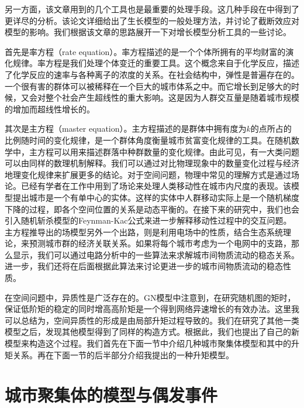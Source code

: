 另一方面，该文章用到的几个工具也是最重要的处理手段。这几种手段在\cite{Bagrow_2008}中得到了更详尽的分析。该论文详细给出了生长模型的一般处理方法，并讨论了截断效应对模型的影响。我们根据该文章的思路展开一下对增长模型分析工具的一些讨论。

首先是率方程（rate equation）。率方程描述的是一个个体所拥有的平均财富的演化规律。率方程是我们处理个体变迁的重要工具。这个概念来自于化学反应，描述了化学反应的速率与各种离子的浓度的关系。在社会结构中，弹性\cite{gao2016universal}是普遍存在的。一个很有害的群体可以被稀释在一个巨大的城市体系之中。而它增长到足够大的时候，又会对整个社会产生超线性的重大影响\cite{schlapfer2014scaling}。这是因为人群交互量是随着城市规模的增加而超线性增长的。

其次是主方程（master equation）。主方程描述的是群体中拥有度为$k$的点所占的比例随时间的变化规律，是一个群体角度衡量城市贫富变化规律的工具。在随机数学中，主方程可以用来描述群落中种群数量的变化规律。由此可见，有一大类问题可以由同样的数理机制解释。我们可以通过对比物理现象中的数量变化过程与经济地理变化规律来扩展更多的结论。对于空间问题，物理中常见的理解方式是通过场论。已经有学者在工作中用到了场论来处理人类移动性在城市内尺度的表现\cite{molas2017field}。该模型提出城市是一个有单中心的实体。这样的实体中人群移动实际上是一个随机梯度下降的过程，即各个空间位置的关系是动态平衡的。在接下来的研究中，我们也会引入随机斩杀模型的Feynman-Kac公式\cite{PhysRevE.98.052114}来进一步解释移动性过程中的交互问题。主方程推导出的场模型另外一个出路，则是利用电场中的性质，结合生态系统理论，来预测城市群的经济关联关系。如果将每个城市考虑为一个电网中的支路，那么\cite{doyle1984random,Volchenkov2011Random}显示，我们可以通过电路分析中的一些算法来求解城市间物质流动的稳态关系。进一步，我们还将在后面根据此算法来讨论更进一步的城市间物质流动的稳态性质。

在空间问题中，异质性是广泛存在的。GN模型中注意到，在研究随机图的矩时，保证低阶矩的稳定的同时增高高阶矩是一个得到网络异速增长的有效办法。这里我可以总结为，空间异质性的形成是由局部升矩过程导致的。我们在研究了其他一类模型之后，发现其他模型得到了同样的构造方式。根据此，我们也提出了自己的新模型来构造这个过程。我们首先在下面一节中介绍几种城市聚集体模型和其中的升矩关系。再在下面一节的后半部分介绍我提出的一种升矩模型。

\section{城市聚集体的模型与偶发事件}

